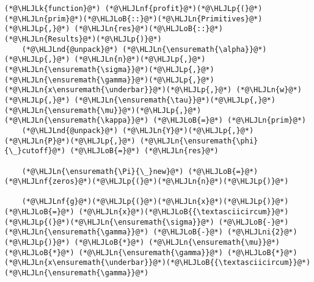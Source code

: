 \documentclass[12pt,a4paper]{article}
\newcommand{\HLJLk}[1]{\textcolor[RGB]{148,91,176}{\textbf{#1}}}
\newcommand{\HLJLn}[1]{#1}
\newcommand{\HLJLnd}[1]{\textcolor[RGB]{214,102,97}{#1}}
\newcommand{\HLJLnf}[1]{\textcolor[RGB]{66,102,213}{#1}}
\newcommand{\HLJLni}[1]{\textcolor[RGB]{59,151,46}{#1}}
\newcommand{\HLJLoB}[1]{\textcolor[RGB]{102,102,102}{\textbf{#1}}}
\newcommand{\HLJLp}[1]{#1}
\begin{document}
\begin{lstlisting}
(*@\HLJLk{function}@*) (*@\HLJLnf{profit}@*)(*@\HLJLp{(}@*)(*@\HLJLn{prim}@*)(*@\HLJLoB{::}@*)(*@\HLJLn{Primitives}@*)(*@\HLJLp{,}@*) (*@\HLJLn{res}@*)(*@\HLJLoB{::}@*)(*@\HLJLn{Results}@*)(*@\HLJLp{)}@*)
    (*@\HLJLnd{@unpack}@*) (*@\HLJLn{\ensuremath{\alpha}}@*)(*@\HLJLp{,}@*) (*@\HLJLn{n}@*)(*@\HLJLp{,}@*) (*@\HLJLn{\ensuremath{\sigma}}@*)(*@\HLJLp{,}@*) (*@\HLJLn{\ensuremath{\gamma}}@*)(*@\HLJLp{,}@*) (*@\HLJLn{x\ensuremath{\underbar}}@*)(*@\HLJLp{,}@*) (*@\HLJLn{w}@*)(*@\HLJLp{,}@*) (*@\HLJLn{\ensuremath{\tau}}@*)(*@\HLJLp{,}@*) (*@\HLJLn{\ensuremath{\mu}}@*)(*@\HLJLp{,}@*) (*@\HLJLn{\ensuremath{\kappa}}@*) (*@\HLJLoB{=}@*) (*@\HLJLn{prim}@*)
    (*@\HLJLnd{@unpack}@*) (*@\HLJLn{Y}@*)(*@\HLJLp{,}@*) (*@\HLJLn{P}@*)(*@\HLJLp{,}@*) (*@\HLJLn{\ensuremath{\phi}{\_}cutoff}@*) (*@\HLJLoB{=}@*) (*@\HLJLn{res}@*)

    (*@\HLJLn{\ensuremath{\Pi}{\_}new}@*) (*@\HLJLoB{=}@*) (*@\HLJLnf{zeros}@*)(*@\HLJLp{(}@*)(*@\HLJLn{n}@*)(*@\HLJLp{)}@*)

    (*@\HLJLnf{g}@*)(*@\HLJLp{(}@*)(*@\HLJLn{x}@*)(*@\HLJLp{)}@*) (*@\HLJLoB{=}@*) (*@\HLJLn{x}@*)(*@\HLJLoB{{\textasciicircum}}@*)(*@\HLJLp{(}@*)(*@\HLJLn{\ensuremath{\sigma}}@*) (*@\HLJLoB{-}@*) (*@\HLJLn{\ensuremath{\gamma}}@*) (*@\HLJLoB{-}@*) (*@\HLJLni{2}@*)(*@\HLJLp{)}@*) (*@\HLJLoB{*}@*) (*@\HLJLn{\ensuremath{\mu}}@*) (*@\HLJLoB{*}@*) (*@\HLJLn{\ensuremath{\gamma}}@*) (*@\HLJLoB{*}@*) (*@\HLJLn{x\ensuremath{\underbar}}@*)(*@\HLJLoB{{\textasciicircum}}@*)(*@\HLJLn{\ensuremath{\gamma}}@*)


\end{lstlisting}
\end{document}
